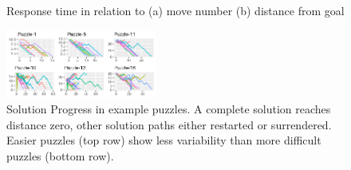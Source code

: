 \documentclass[10pt,letterpaper]{article}
\begin{document}
\begin{figure}[t]
\vspace{-0.03cm}
	\centering
\vspace{-0.1cm}
	\caption{Response time in relation to (a) move number (b)  distance from goal} 
\vspace{-0.55cm}
	\label{fig:rt}
\end{figure}

\begin{figure}[!t]
\begin{center}
\includegraphics[width=0.44\textwidth]{p6_1}
\end{center}
\vspace{-0.25cm}
\caption{Solution Progress in example puzzles. A complete solution reaches distance zero, other solution paths either restarted or surrendered. Easier puzzles (top row) show less variability than more difficult puzzles (bottom row).} 
\label{fig:progress}
\vspace{-0.65cm}
\end{figure}
\end{document}
